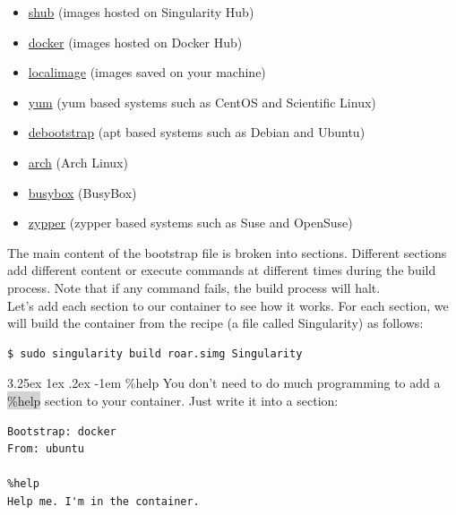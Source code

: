 \documentclass[a4paper]{article}
\makeatletter
\newcounter{subsubsubsection}[subsubsection]
\renewcommand\paragraph{\@startsection{paragraph}{5}{\z@}%
  {3.25ex \@plus1ex \@minus.2ex}%
  {-1em}%
  {\normalfont\normalsize\bfseries}}
\makeatother
\begin{document}
	\begin{itemize}
	\item  \href{http://singularity.lbl.gov/build-shub}{shub} (images hosted on Singularity Hub)
	\item  \href{http://singularity.lbl.gov/build-docker-module}{docker} (images hosted on Docker Hub)
	\item  \href{http://singularity.lbl.gov/build-localimage}{localimage} (images saved on your machine)
	\item  \href{http://singularity.lbl.gov/build-yum}{yum} (yum based systems such as CentOS and Scientific Linux)
	\item  \href{http://singularity.lbl.gov/build-debootstrap}{debootstrap} (apt based systems such as Debian and Ubuntu)
	\item  \href{http://singularity.lbl.gov/build-arch}{arch} (Arch Linux)
	\item  \href{http://singularity.lbl.gov/build-busybox}{busybox} (BusyBox)
	\item  \href{http://singularity.lbl.gov/build-zypper}{zypper} (zypper based systems such as Suse and OpenSuse)
	\end{itemize}
	
	
	
	The main content of the bootstrap file is broken into sections. Different sections add different content or execute commands at different times during the build process. Note that if any command fails, the build process will halt.\\[0.1in]
Let’s add each section to our container to see how it works. For each section, we will build the container from the recipe (a file called Singularity) as follows:

\begin{lstlisting}[frame=single] 
$ sudo singularity build roar.simg Singularity
\end{lstlisting}


\paragraph{\%help}
\label{sec:writehelpdocs}
You don’t need to do much programming to add a \colorbox{lightgray}{\%help} section to your container. Just write it into a section:\\[0.1in]

\begin{lstlisting}[frame=single] 
Bootstrap: docker
From: ubuntu

%help
Help me. I'm in the container.
\end{lstlisting}
\end{document}
